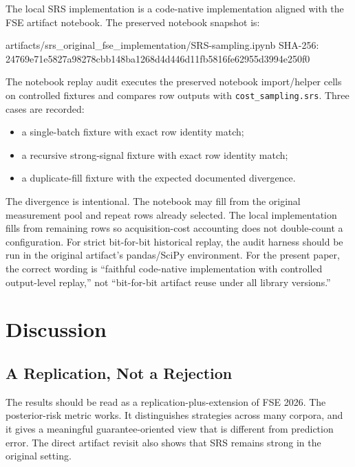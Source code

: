 \documentclass[smallcondensed]{svjour3}
\newenvironment{Shaded}{}{}
\newcommand{\NormalTok}[1]{#1}
\providecommand{\tightlist}{%
  \setlength{\itemsep}{0pt}\setlength{\parskip}{0pt}}
\begin{document}
The local SRS implementation is a code-native implementation aligned
with the FSE artifact notebook. The preserved notebook snapshot is:

\begin{Shaded}
\begin{Highlighting}[]
\NormalTok{artifacts/srs\_original\_fse\_implementation/SRS{-}sampling.ipynb}
\NormalTok{SHA{-}256: 24769e71e5827a98278cbb148ba1268d4d446d11fb5816fe62955d3994e250f0}
\end{Highlighting}
\end{Shaded}

The notebook replay audit executes the preserved notebook import/helper
cells on controlled fixtures and compares row outputs with
\texttt{cost\_sampling.srs}. Three cases are recorded:

\begin{itemize}
\tightlist
\item
  a single-batch fixture with exact row identity match;
\item
  a recursive strong-signal fixture with exact row identity match;
\item
  a duplicate-fill fixture with the expected documented divergence.
\end{itemize}

The divergence is intentional. The notebook may fill from the original
measurement pool and repeat rows already selected. The local
implementation fills from remaining rows so acquisition-cost accounting
does not double-count a configuration. For strict bit-for-bit historical
replay, the audit harness should be run in the original artifact's
pandas/SciPy environment. For the present paper, the correct wording is
``faithful code-native implementation with controlled output-level
replay,'' not ``bit-for-bit artifact reuse under all library versions.''

\section{Discussion}\label{discussion}

\subsection{A Replication, Not a
Rejection}\label{a-replication-not-a-rejection}

The results should be read as a replication-plus-extension of FSE 2026.
The posterior-risk metric works. It distinguishes strategies across many
corpora, and it gives a meaningful guarantee-oriented view that is
different from prediction error. The direct artifact revisit also shows
that SRS remains strong in the original setting.
\end{document}
